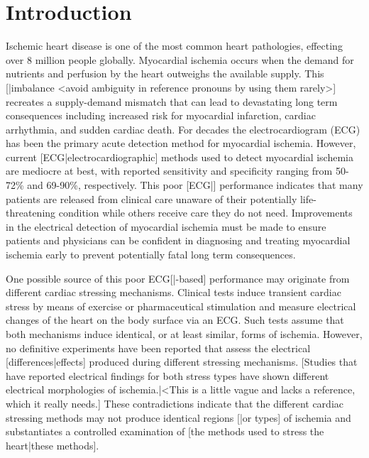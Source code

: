 \documentclass[twocolumn]{cinc}
\begin{document}
\section{Introduction}


Ischemic heart disease is one of the most common heart pathologies,
effecting over 8 million people globally. \cite{Roth2015} Myocardial
ischemia occurs when the demand for nutrients and perfusion by the heart
outweighs the available supply. This [|imbalance <avoid ambiguity in
reference pronouns by using them rarely>] recreates a supply-demand
mismatch that can lead to devastating long term consequences including
increased risk for myocardial infarction, cardiac arrhythmia, and sudden
cardiac death.\cite{Roth2015} For decades the electrocardiogram (ECG) has
been the primary acute detection method for myocardial
ischemia. \cite{McCarthy1990} However, current [ECG|electrocardiographic]
methods used to detect myocardial ischemia are mediocre at best, with
reported sensitivity and specificity ranging from 50-72\% and 69-90\%,
respectively. \cite{Akkerhuis2011} This poor [ECG|] performance indicates
that many patients are released from clinical care unaware of their
potentially life-threatening condition while others receive care they do
not need. Improvements in the electrical detection of myocardial ischemia
must be made to ensure patients and physicians can be confident in
diagnosing and treating myocardial ischemia early to prevent potentially
fatal long term consequences.

One possible source of this poor ECG[|-based] performance may originate
from different cardiac stressing mechanisms. Clinical tests induce
transient cardiac stress by means of exercise or pharmaceutical stimulation
and measure electrical changes of the heart on the body surface via an
ECG. Such tests assume that both mechanisms induce identical, or at least
similar, forms of ischemia. However, no definitive experiments have been
reported that assess the electrical [differences|effects] produced during
different stressing mechanisms. [Studies that have reported electrical
findings for both stress types have shown different electrical morphologies
of ischemia.|<This is a little vague and lacks a reference, which it really
needs.] These contradictions indicate that the different cardiac stressing
methods may not produce identical regions [|or types] of ischemia and
substantiates a controlled examination of [the methods used to stress the
heart|these methods].
\end{document}
